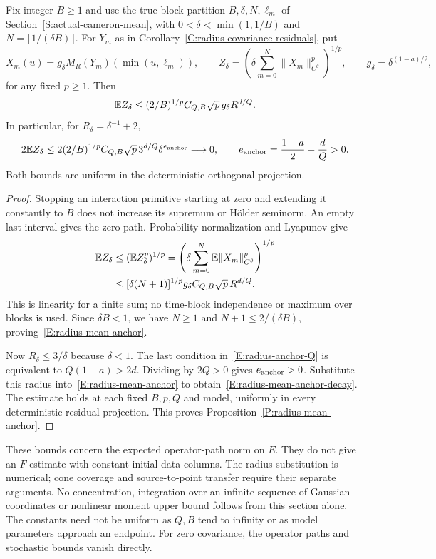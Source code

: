 \begin{proposition}
  \label{P:radius-mean-anchor}
  Fix integer $B \ge 1$ and use the true block partition $B,\delta,N,\ell_m$ of
  Section~\ref{S:actual-cameron-mean}, with $0 < \delta < \min(1,1/B)$ and $N =
  \lfloor1/(\delta B)\rfloor$. For $Y_m$ as in
  Corollary~\ref{C:radius-covariance-residuals}, put
  \[
    X_m(u)=g_\delta M_R(Y_m)(\min(u,\ell_m)),\qquad
    Z_\delta=\left(\delta\sum_{m=0}^N
    \|X_m\|_{C^\theta}^p\right)^{1/p},\qquad
    g_\delta=\delta^{(1-a)/2},
  \]
  for any fixed $p \ge 1$. Then
  \begin{equation}\label{E:radius-mean-anchor}
    \mathbb{E} Z_\delta\le(2/B)^{1/p}C_{Q,B}\sqrt p\,
    g_\delta R^{d/Q}.
  \end{equation}
  In particular, for $R_\delta = \delta^{-1}+2$,
  \begin{equation}\label{E:radius-mean-anchor-decay}
    2\mathbb{E} Z_\delta
    \le2(2/B)^{1/p}C_{Q,B}\sqrt p\,3^{d/Q}
    \delta^{e_{\rm anchor}}\longrightarrow0,\qquad
    e_{\rm anchor}=\frac{1-a}{2}-\frac dQ>0 .
  \end{equation}
  Both bounds are uniform in the deterministic orthogonal projection.
\end{proposition}

\begin{proof}
  Stopping an interaction primitive starting at zero and extending it constantly
  to $B$ does not increase its supremum or H\"older seminorm. An empty last
  interval gives the zero path. Probability normalization and Lyapunov give
  \begin{align*}
    \mathbb{E} Z_\delta
    &\le(\mathbb{E} Z_\delta^p)^{1/p}
    =\left(\delta\sum_{m=0}^N
    \mathbb{E}\|X_m\|_{C^\theta}^p\right)^{1/p}\\
    &\le[\delta(N+1)]^{1/p}g_\delta
    C_{Q,B}\sqrt p\,R^{d/Q}.
  \end{align*}
  This is linearity for a finite sum; no time-block independence or maximum over
  blocks is used. Since $\delta B < 1$, we have $N \ge 1$ and $N+1 \le 2/(\delta
  B)$, proving~\eqref{E:radius-mean-anchor}.

  Now $R_\delta \le 3/\delta$ because $\delta < 1$. The last condition
  in~\eqref{E:radius-anchor-Q} is equivalent to $Q(1-a) > 2d$. Dividing by $2Q >
  0$ gives $e_{\rm anchor} > 0$. Substitute this radius
  into~\eqref{E:radius-mean-anchor} to
  obtain~\eqref{E:radius-mean-anchor-decay}. The estimate holds at each fixed
  $B,p,Q$ and model, uniformly in every deterministic residual projection. This
  proves Proposition~\ref{P:radius-mean-anchor}.
\end{proof}

These bounds concern the expected operator-path norm on $E$. They do not give an
$F$ estimate with constant initial-data columns. The radius substitution is
numerical; cone coverage and source-to-point transfer require their separate
arguments. No concentration, integration over an infinite sequence of Gaussian
coordinates or nonlinear moment upper bound follows from this section alone. The
constants need not be uniform as $Q,B$ tend to infinity or as model parameters
approach an endpoint. For zero covariance, the operator paths and stochastic
bounds vanish directly.
